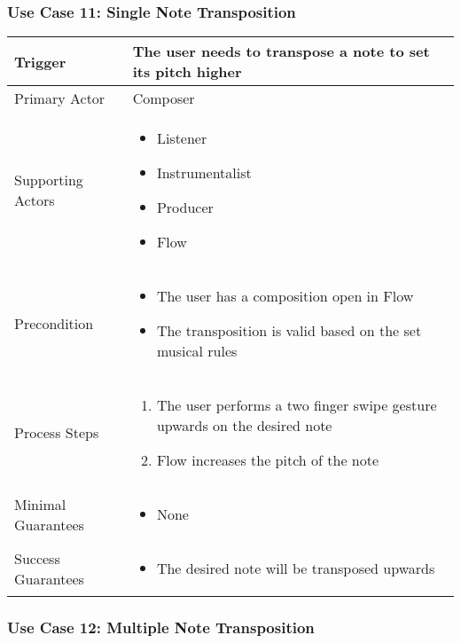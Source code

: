 \subsubsection{Use Case 11: Single Note Transposition}

\begin{tabularx}{\textwidth}{|X|X|}
\hline
Trigger & 
The user needs to transpose a note to set its pitch higher \\
\hline
Primary Actor & 
Composer \\
\hline
Supporting Actors & 
\begin{itemize}
\item Listener
\item Instrumentalist
\item Producer
\item Flow
\end{itemize} \\
\hline
Precondition & 
\begin{itemize}
\item The user has a composition open in Flow
\item The transposition is valid based on the set musical rules
\end{itemize} \\
\hline
Process Steps & 
\begin{enumerate}
\item The user performs a two finger swipe gesture upwards on the desired note
\item Flow increases the pitch of the note
\end{enumerate} \\
\hline
Minimal Guarantees & 
\begin{itemize}
  \item None
\end{itemize} \\
\hline
Success Guarantees & 
\begin{itemize}
  \item The desired note will be transposed upwards
\end{itemize} \\
\hline
\end{tabularx}

\subsubsection{Use Case 12: Multiple Note Transposition}

